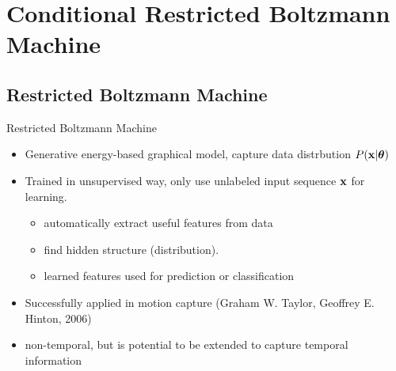 \section{Conditional Restricted Boltzmann Machine} %
\subsection{Restricted Boltzmann Machine}
	\begin{frame}[t]{Restricted Boltzmann Machine}
	 \begin{itemize}
	  \itemsep10pt
	  \item Generative energy-based graphical model, capture data distrbution $P(\mathbf{x}|\boldsymbol{\theta})$
	  \item Trained in unsupervised way, only use unlabeled input sequence $\mathbf{x}$ for learning. 
		  \begin{itemize}
		   \item automatically extract useful features from data 
		   \item find hidden structure (distribution). 
		   \item learned features used for prediction or classification
		  \end{itemize}
	  \item Successfully applied in motion capture (Graham W. Taylor, Geoffrey E. Hinton, 2006)
	  \item non-temporal, but is potential to be extended to capture temporal information
	 \end{itemize}
	\end{frame}
	
